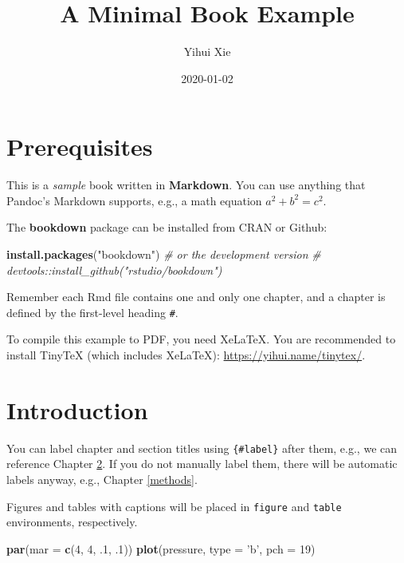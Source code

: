 \documentclass[]{book}
\title{A Minimal Book Example}
\author{Yihui Xie}
\date{2020-01-02}
\newenvironment{Shaded}{\begin{snugshade}}{\end{snugshade}}
\newcommand{\CommentTok}[1]{\textcolor[rgb]{0.56,0.35,0.01}{\textit{#1}}}
\newcommand{\DataTypeTok}[1]{\textcolor[rgb]{0.13,0.29,0.53}{#1}}
\newcommand{\DecValTok}[1]{\textcolor[rgb]{0.00,0.00,0.81}{#1}}
\newcommand{\FloatTok}[1]{\textcolor[rgb]{0.00,0.00,0.81}{#1}}
\newcommand{\KeywordTok}[1]{\textcolor[rgb]{0.13,0.29,0.53}{\textbf{#1}}}
\newcommand{\NormalTok}[1]{#1}
\newcommand{\StringTok}[1]{\textcolor[rgb]{0.31,0.60,0.02}{#1}}
\begin{document}
\maketitle

{
\setcounter{tocdepth}{1}
\tableofcontents
}
\hypertarget{prerequisites}{%
\chapter{Prerequisites}\label{prerequisites}}

This is a \emph{sample} book written in \textbf{Markdown}. You can use anything that Pandoc's Markdown supports, e.g., a math equation \(a^2 + b^2 = c^2\).

The \textbf{bookdown} package can be installed from CRAN or Github:

\begin{Shaded}
\begin{Highlighting}[]
\KeywordTok{install.packages}\NormalTok{(}\StringTok{"bookdown"}\NormalTok{)}
\CommentTok{# or the development version}
\CommentTok{# devtools::install_github("rstudio/bookdown")}
\end{Highlighting}
\end{Shaded}

Remember each Rmd file contains one and only one chapter, and a chapter is defined by the first-level heading \texttt{\#}.

To compile this example to PDF, you need XeLaTeX. You are recommended to install TinyTeX (which includes XeLaTeX): \url{https://yihui.name/tinytex/}.

\hypertarget{intro}{%
\chapter{Introduction}\label{intro}}

You can label chapter and section titles using \texttt{\{\#label\}} after them, e.g., we can reference Chapter \ref{intro}. If you do not manually label them, there will be automatic labels anyway, e.g., Chapter \ref{methods}.

Figures and tables with captions will be placed in \texttt{figure} and \texttt{table} environments, respectively.

\begin{Shaded}
\begin{Highlighting}[]
\KeywordTok{par}\NormalTok{(}\DataTypeTok{mar =} \KeywordTok{c}\NormalTok{(}\DecValTok{4}\NormalTok{, }\DecValTok{4}\NormalTok{, }\FloatTok{.1}\NormalTok{, }\FloatTok{.1}\NormalTok{))}
\KeywordTok{plot}\NormalTok{(pressure, }\DataTypeTok{type =} \StringTok{'b'}\NormalTok{, }\DataTypeTok{pch =} \DecValTok{19}\NormalTok{)}
\end{Highlighting}
\end{Shaded}
\end{document}

